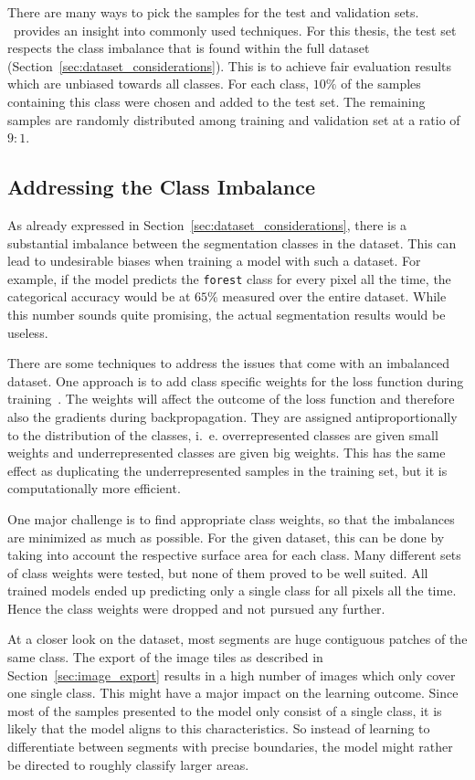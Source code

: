 There are many ways to pick the samples for the test and validation sets. \cite{val_split18}~provides an insight into commonly used techniques. For this thesis, the test set respects the class imbalance that is found within the full dataset (Section~\ref{sec:dataset_considerations}). This is to achieve fair evaluation results which are unbiased towards all classes. For each class, $10\%$ of the samples containing this class were chosen and added to the test set. The remaining samples are randomly distributed among training and validation set at a ratio of $9:1$.

\subsection{Addressing the Class Imbalance}
\label{sec:class_imbalance}
As already expressed in Section~\ref{sec:dataset_considerations}, there is a substantial imbalance between the segmentation classes in the dataset. This can lead to undesirable biases when training a model with such a dataset. For example, if the model predicts the \texttt{forest} class for every pixel all the time, the categorical accuracy would be at $65\%$ measured over the entire dataset. While this number sounds quite promising, the actual segmentation results would be useless.

There are some techniques to address the issues that come with an imbalanced dataset. One approach is to add class specific weights for the loss function during training~\cite{class_imbalance19}. The weights will affect the outcome of the loss function and therefore also the gradients during backpropagation. They are assigned antiproportionally to the distribution of the classes, i.~e. overrepresented classes are given small weights and underrepresented classes are given big weights. This has the same effect as duplicating the underrepresented samples in the training set, but it is computationally more efficient.

One major challenge is to find appropriate class weights, so that the imbalances are minimized as much as possible. For the given dataset, this can be done by taking into account the respective surface area for each class. Many different sets of class weights were tested, but none of them proved to be well suited. All trained models ended up predicting only a single class for all pixels all the time. Hence the class weights were dropped and not pursued any further.

At a closer look on the dataset, most segments are huge contiguous patches of the same class. The export of the image tiles as described in Section~\ref{sec:image_export} results in a high number of images which only cover one single class. This might have a major impact on the learning outcome. Since most of the samples presented to the model only consist of a single class, it is likely that the model aligns to this characteristics. So instead of learning to differentiate between segments with precise boundaries, the model might rather be directed to roughly classify larger areas.

